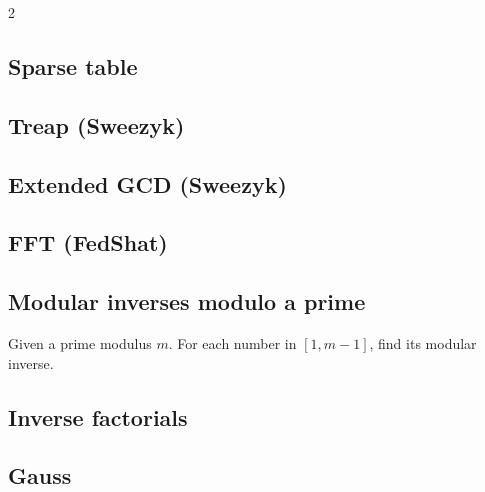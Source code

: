 \documentclass[a4paper]{article}
\begin{document}
\begin{multicols*}{2}
        \subsection{Sparse table}
            
        
        \subsection{Treap (Sweezyk)}
            
        
        \subsection{Extended GCD (Sweezyk)}
            
        
        \subsection{FFT (FedShat)}
            
        
        
        \subsection{Modular inverses modulo a prime}
            Given a prime modulus $m$. For each number in $[1, m - 1]$, find its modular inverse.
            
        
        \subsection{Inverse factorials}
            
        
        \subsection{Gauss}
            
            

\end{multicols*}
\end{document}
